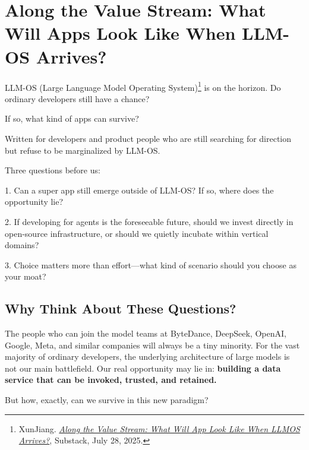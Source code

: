 \chapter*{Along the Value Stream: What Will Apps Look Like When LLM-OS Arrives?}
{}
\label{ch:llm_os}

{\kaiti
LLM-OS (Large Language Model Operating System)\footnote{XunJiang. \href{https://xun140202.substack.com/p/along-the-value-stream-what-will}{\textit{Along the Value Stream: What Will App Look Like When LLMOS Arrives?}}, Substack, July 28, 2025.} is on the horizon. Do ordinary developers still have a chance?

If so, what kind of apps can survive?

Written for developers and product people who are still searching for direction but refuse to be marginalized by LLM-OS.
}

\vspace{1em}

Three questions before us:

1. Can a super app still emerge outside of LLM-OS? If so, where does the opportunity lie?

2. If developing for agents is the foreseeable future, should we invest directly in open-source infrastructure, or should we quietly incubate within vertical domains?

3. Choice matters more than effort---what kind of scenario should you choose as your moat?

\section{Why Think About These Questions?}

The people who can join the model teams at ByteDance, DeepSeek, OpenAI, Google, Meta, and similar companies will always be a tiny minority. For the vast majority of ordinary developers, the underlying architecture of large models is not our main battlefield. Our real opportunity may lie in: \textbf{building a data service that can be invoked, trusted, and retained.}

\begin{thinkbox}
But how, exactly, can we survive in this new paradigm?
\end{thinkbox}

